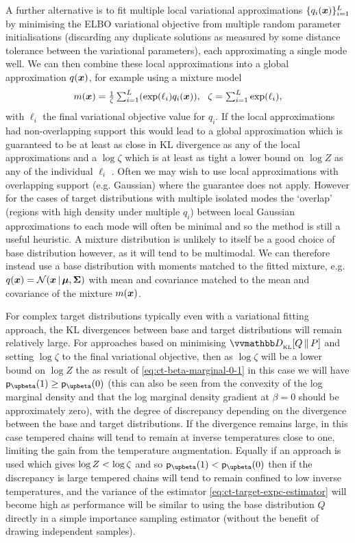 A further alternative is to fit multiple local variational approximations $\lbrace q_i(\boldsymbol{x}) \rbrace_{i=1}^L$ by minimising the \ac{ELBO} variational objective from multiple random parameter initialisations (discarding any duplicate solutions as measured by some distance tolerance between the variational parameters), each approximating a single mode well. We can then combine these local approximations into a global approximation $q(\boldsymbol{x})$, for example using a mixture model
\begin{equation}\label{eq:variational-mixture-approx}\textstyle
  m(\vct{x}) = \frac{1}{\zeta} \sum_{i=1}^L \lpa \exp(\ell_i) q_i(\vct{x}) \rpa,~~
  \zeta = \sum_{i=1}^L \exp(\ell_i),
\end{equation}
with $\ell_i$ the final variational objective value for $q_i$. If the local approximations had non-overlapping support this would lead to a global approximation which is guaranteed to be at least as close in \ac{KL} divergence as any of the local approximations and a $\log \zeta$ which is at least as tight a lower bound on $\log Z$ as any of the individual $\ell_i$ \citep{zobay2009mean}. Often we may wish to use local approximations with overlapping support (e.g. Gaussian) where the guarantee does not apply. However for the cases of target distributions with multiple isolated modes the `overlap' (regions with high density under multiple $q_i$) between local Gaussian approximations to each mode will often be minimal and so the method is still a useful heuristic. A mixture distribution is unlikely to itself be a good choice of base distribution however, as it will tend to be multimodal. We can therefore instead use a base distribution with moments matched to the fitted mixture, e.g. $q(\vct{x}) = \nrm{\vct{x}\gvn\vct{\mu},\mtx{\Sigma}}$ with mean and covariance matched to the mean and covariance of the mixture $m(\boldsymbol{x})$.

For complex target distributions typically even with a variational fitting approach, the \ac{KL} divergences between base and target distributions will remain relatively large. For approaches based on minimising $\kldiv{Q}{P}$ and setting $\log \zeta$ to the final variational objective, then as $\log \zeta$ will be a lower bound on $\log Z$ the as result of \eqref{eq:ct-beta-marginal-0-1} in this case we will have $\pden{\upbeta}(1) \geq \pden{\upbeta}(0)$ (this can also be seen from the convexity of the log marginal density and that the log marginal density gradient at $\beta=0$ should be approximately zero), with the degree of discrepancy depending on the divergence between the base and target distributions. If the divergence remains large, in this case tempered chains will tend to remain at inverse temperatures close to one, limiting the gain from the temperature augmentation. Equally if an approach is used which gives $\log Z <  \log\zeta$ and so $\pden{\upbeta}(1) < \pden{\upbeta}(0)$ then if the discrepancy is large tempered chains will tend to remain confined to low inverse temperatures, and the variance of the estimator \eqref{eq:ct-target-expc-estimator} will become high as performance will be similar to using the base distribution $Q$ directly in a simple importance sampling estimator (without the benefit of drawing independent samples).

